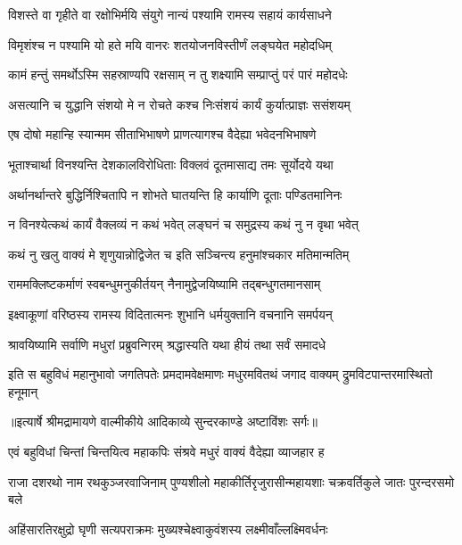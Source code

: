 \twolineshloka
{विशस्ते वा गृहीते वा रक्षोभिर्मयि संयुगे}
{नान्यं पश्यामि रामस्य सहायं कार्यसाधने} %

\twolineshloka
{विमृशंश्च न पश्यामि यो हते मयि वानरः}
{शतयोजनविस्तीर्णं लङ्घयेत महोदधिम्} %

\twolineshloka
{कामं हन्तुं समर्थोऽस्मि सहस्राण्यपि रक्षसाम्}
{न तु शक्ष्यामि सम्प्राप्तुं परं पारं महोदधेः} %

\twolineshloka
{असत्यानि च युद्धानि संशयो मे न रोचते}
{कश्च निःसंशयं कार्यं कुर्यात्प्राज्ञः ससंशयम्} %

\twolineshloka
{एष दोषो महान्हि स्यान्मम सीताभिभाषणे}
{प्राणत्यागश्च वैदेह्या भवेदनभिभाषणे} %

\twolineshloka
{भूताश्चार्था विनश्यन्ति देशकालविरोधिताः}
{विक्लवं दूतमासाद्य तमः सूर्योदये यथा} %

\twolineshloka
{अर्थानर्थान्तरे बुद्धिर्निश्चितापि न शोभते}
{घातयन्ति हि कार्याणि दूताः पण्डितमानिनः} %

\twolineshloka
{न विनश्येत्कथं कार्यं वैक्लव्यं न कथं भवेत्}
{लङ्घनं च समुद्रस्य कथं नु न वृथा भवेत्} %

\twolineshloka
{कथं नु खलु वाक्यं मे शृणुयान्नोद्विजेत च}
{इति सञ्चिन्त्य हनुमांश्चकार मतिमान्मतिम्} %

\twolineshloka
{राममक्लिष्टकर्माणं स्वबन्धुमनुकीर्तयन्}
{नैनामुद्वेजयिष्यामि तद्बन्धुगतमानसाम्} %

\twolineshloka
{इक्ष्वाकूणां वरिष्ठस्य रामस्य विदितात्मनः}
{शुभानि धर्मयुक्तानि वचनानि समर्पयन्} %

\twolineshloka
{श्रावयिष्यामि सर्वाणि मधुरां प्रब्रुवन्गिरम्}
{श्रद्धास्यति यथा हीयं तथा सर्वं समादधे} %

\fourlineindentedshloka
{इति स बहुविधं महानुभावो}
{जगतिपतेः प्रमदामवेक्षमाणः}
{मधुरमवितथं जगाद वाक्यम्}
{द्रुमविटपान्तरमास्थितो हनूमान्} %


{॥इत्यार्षे श्रीमद्रामायणे वाल्मीकीये आदिकाव्ये सुन्दरकाण्डे अष्टाविंशः सर्गः॥}


\twolineshloka
{एवं बहुविधां चिन्तां चिन्तयित्व महाकपिः}
{संश्रवे मधुरं वाक्यं वैदेह्या व्याजहार ह} %

\threelineshloka
{राजा दशरथो नाम रथकुञ्जरवाजिनाम्}
{पुण्यशीलो महाकीर्तिरृजुरासीन्महायशाः}
{चक्रवर्तिकुले जातः पुरन्दरसमो बले} %

\twolineshloka
{अहिंसारतिरक्षुद्रो घृणी सत्यपराक्रमः}
{मुख्यश्चेक्ष्वाकुवंशस्य लक्ष्मीवाँल्लक्ष्मिवर्धनः} %

